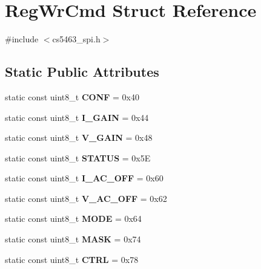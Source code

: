 \hypertarget{structRegWrCmd}{\section{Reg\-Wr\-Cmd Struct Reference}
\label{structRegWrCmd}
}


{\ttfamily \#include $<$cs5463\-\_\-spi.\-h$>$}

\subsection*{Static Public Attributes}
\begin{DoxyCompactItemize}
\item 
\hypertarget{structRegWrCmd_acea1422b6a8b632da8bce3120b5604c7}{static const uint8\-\_\-t {\bfseries C\-O\-N\-F} = 0x40}\label{structRegWrCmd_acea1422b6a8b632da8bce3120b5604c7}

\item 
\hypertarget{structRegWrCmd_a1eb14f1a65491ee4c58068e9770cf255}{static const uint8\-\_\-t {\bfseries I\-\_\-\-G\-A\-I\-N} = 0x44}\label{structRegWrCmd_a1eb14f1a65491ee4c58068e9770cf255}

\item 
\hypertarget{structRegWrCmd_a3c35929f75b18b725c7589e5465164f8}{static const uint8\-\_\-t {\bfseries V\-\_\-\-G\-A\-I\-N} = 0x48}\label{structRegWrCmd_a3c35929f75b18b725c7589e5465164f8}

\item 
\hypertarget{structRegWrCmd_a5323b16d1c9a2d72f87247f885cdb464}{static const uint8\-\_\-t {\bfseries S\-T\-A\-T\-U\-S} = 0x5\-E}\label{structRegWrCmd_a5323b16d1c9a2d72f87247f885cdb464}

\item 
\hypertarget{structRegWrCmd_af18fd564bb13549480de94940c90c136}{static const uint8\-\_\-t {\bfseries I\-\_\-\-A\-C\-\_\-\-O\-F\-F} = 0x60}\label{structRegWrCmd_af18fd564bb13549480de94940c90c136}

\item 
\hypertarget{structRegWrCmd_afc8900fb78d204c73d611ffae2ef1fa4}{static const uint8\-\_\-t {\bfseries V\-\_\-\-A\-C\-\_\-\-O\-F\-F} = 0x62}\label{structRegWrCmd_afc8900fb78d204c73d611ffae2ef1fa4}

\item 
\hypertarget{structRegWrCmd_af4149a6fa68b3a5a2f28da2720abe626}{static const uint8\-\_\-t {\bfseries M\-O\-D\-E} = 0x64}\label{structRegWrCmd_af4149a6fa68b3a5a2f28da2720abe626}

\item 
\hypertarget{structRegWrCmd_a0ea7b97afdabffea76b1acb8b6b09aca}{static const uint8\-\_\-t {\bfseries M\-A\-S\-K} = 0x74}\label{structRegWrCmd_a0ea7b97afdabffea76b1acb8b6b09aca}

\item 
\hypertarget{structRegWrCmd_a820e7dd89402af74c3a4b9ba8264284b}{static const uint8\-\_\-t {\bfseries C\-T\-R\-L} = 0x78}\label{structRegWrCmd_a820e7dd89402af74c3a4b9ba8264284b}

\end{DoxyCompactItemize}


